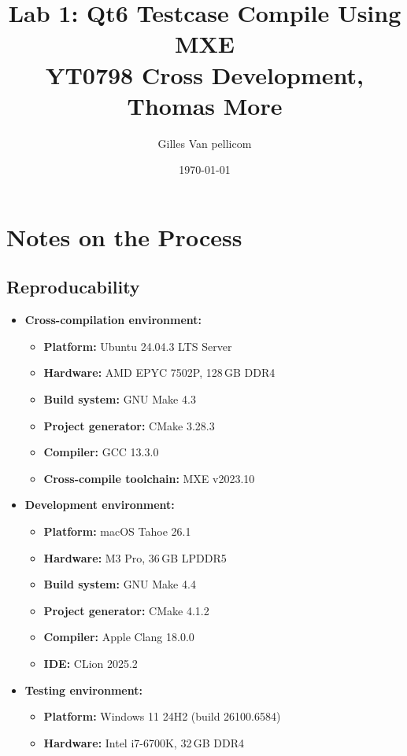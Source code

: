 \documentclass{report}
\title{Lab 1: Qt6 Testcase Compile Using MXE\\\large YT0798 Cross Development, Thomas More}
\author{Gilles Van pellicom}
\date{\today}
\begin{document}
\maketitle

\tableofcontents
\clearpage

\chapter*{Notes on the Process}

\section*{Reproducability}
\begin{itemize}
    \item \textbf{Cross-compilation environment:}
    \begin{itemize}
        \item \textbf{Platform:} Ubuntu 24.04.3 LTS Server
        \item \textbf{Hardware:} AMD EPYC 7502P, 128\,GB DDR4
        \item \textbf{Build system:} GNU Make 4.3
        \item \textbf{Project generator:} CMake 3.28.3
        \item \textbf{Compiler:} GCC 13.3.0
        \item \textbf{Cross-compile toolchain:} MXE v2023.10
    \end{itemize}

    \item \textbf{Development environment:}
    \begin{itemize}
        \item \textbf{Platform:} macOS Tahoe 26.1
        \item \textbf{Hardware:} M3 Pro, 36\,GB LPDDR5
        \item \textbf{Build system:} GNU Make 4.4
        \item \textbf{Project generator:} CMake 4.1.2
        \item \textbf{Compiler:} Apple Clang 18.0.0
        \item \textbf{IDE:} CLion 2025.2
    \end{itemize}

    \item \textbf{Testing environment:}
    \begin{itemize}
        \item \textbf{Platform:} Windows 11 24H2 (build 26100.6584)
        \item \textbf{Hardware:} Intel i7-6700K, 32\,GB DDR4
    \end{itemize}
\end{itemize}
\end{document}
